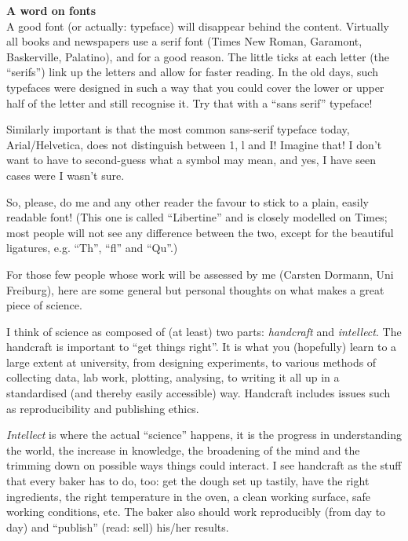\begin{boxmd}
	\textbf{A word on fonts}\\
	A good font (or actually: typeface) will disappear behind the content. Virtually all books and newspapers use a serif font (Times New Roman, Garamont, Baskerville, Palatino), and for a good reason. The little ticks at each letter (the ``serifs'') link up the letters and allow for faster reading. In the old days, such typefaces were designed in such a way that you could cover the lower or upper half of the letter and still recognise it. Try that with a ``sans serif'' typeface!
	
	Similarly important is that the most common sans-serif typeface today, Arial/Helvetica, does not distinguish between 1, l and I! Imagine that! I don't want to have to second-guess what a symbol may mean, and yes, I have seen cases were I wasn't sure.
	
	So, please, do me and any other reader the favour to stick to a plain, easily readable font! (This one is called ``Libertine'' and is closely modelled on Times; most people will not see any difference between the two, except for the beautiful ligatures, e.g. ``Th'', ``fl'' and ``Qu''.)
\end{boxmd}


%

\bigskip
\noindent For those few people whose work will be assessed by me (Carsten Dormann, Uni Freiburg), here are some general but personal thoughts on what makes a great piece of science.

I think of science as composed of (at least) two parts: \emph{handcraft} and \emph{intellect}. The handcraft is important to ``get things right''. It is what you (hopefully) learn to a large extent at university, from designing experiments, to various methods of collecting data, lab work, plotting, analysing, to writing it all up in a standardised (and thereby easily accessible) way. Handcraft includes issues such as reproducibility and publishing ethics.

\emph{Intellect} is where the actual ``science'' happens, it is the progress in understanding the world, the increase in knowledge, the broadening of the mind and the trimming down on possible ways things could interact. I see handcraft as the stuff that every baker has to do, too: get the dough set up tastily, have the right ingredients, the right temperature in the oven, a clean working surface, safe working conditions, etc. The baker also should work reproducibly (from day to day) and ``publish'' (read: sell) his/her results.

